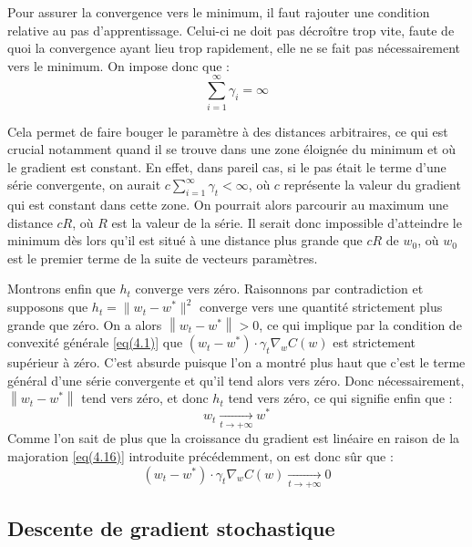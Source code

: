 \documentclass{article}
\begin{document}
Pour assurer la convergence vers le minimum, il faut rajouter une condition relative au pas d'apprentissage. Celui-ci ne doit pas décroître trop vite, faute de quoi la convergence ayant lieu trop rapidement, elle ne se fait pas nécessairement vers le minimum. On impose donc que :
\begin{equation}\label{gamma_discret}
  \sum_{i=1}^{\infty} \gamma_i = \infty
\end{equation}

Cela permet de faire bouger le paramètre à des distances arbitraires, ce qui est crucial notamment quand il se trouve dans une zone éloignée du minimum et où le gradient est constant. En effet, dans pareil cas, si le pas était le terme d'une série convergente, on aurait $c\sum_{i=1}^{\infty} \gamma_t < \infty$, où $c$ représente la valeur du gradient qui est constant dans cette zone. On pourrait alors parcourir au maximum une distance $cR$, où $R$ est la valeur de la série. Il serait donc impossible d'atteindre le minimum dès lors qu'il est situé à une distance plus grande que $cR$ de $w_0$, où $w_0$ est le premier terme de la suite de vecteurs paramètres.
\bigskip

Montrons enfin que $h_t$ converge vers zéro. Raisonnons par contradiction et supposons que $h_t = \lVert w_t - w^* \rVert^2$ converge vers une quantité strictement plus grande que zéro. On a alors $\left\|w_t - w^*\right\| > 0$, ce qui implique par la condition de convexité générale \eqref{eq(4.1)} que $(w_t - w^{*}) \cdot \gamma_t \nabla_wC(w)$ est strictement supérieur à zéro. C'est absurde puisque l'on a montré plus haut que c'est le terme général d'une série convergente et qu'il tend alors vers zéro. Donc nécessairement, $\left\|w_t - w^*\right\|$ tend vers zéro, et donc $h_t$ tend vers zéro, ce qui signifie enfin que :
\begin{equation*} 
  w_t \underset{t\to+\infty}{\longrightarrow} w^*
\end{equation*}
Comme l'on sait de plus que la croissance du gradient est linéaire en raison de la majoration \eqref{eq(4.16)} introduite précédemment, on est donc sûr que :  
\begin{equation*} 
  (w_t - w^{*}) \cdot \gamma_t \nabla_wC(w) \underset{t\to+\infty}{\longrightarrow} 0
\end{equation*}

\subsection{Descente de gradient stochastique}
\end{document}
